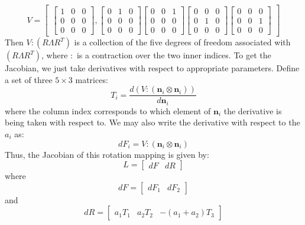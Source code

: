 \documentclass[reqno]{article}
\begin{document}
\begin{equation}
    V
    =
    \begin{bmatrix}
        \begin{bmatrix}
            1 &0 &0 \\
            0 &0 &0 \\
            0 &0 &0
        \end{bmatrix},
        \begin{bmatrix}
            0 &1 &0 \\
            0 &0 &0 \\
            0 &0 &0
        \end{bmatrix}
        \begin{bmatrix}
            0 &0 &1 \\
            0 &0 &0 \\
            0 &0 &0
        \end{bmatrix}
        \begin{bmatrix}
            0 &0 &0 \\
            0 &1 &0 \\
            0 &0 &0
        \end{bmatrix}
        \begin{bmatrix}
            0 &0 &0 \\
            0 &0 &1 \\
            0 &0 &0
        \end{bmatrix}
    \end{bmatrix}
\end{equation}
Then $V : (R \Lambda R^T)$ is a collection of the five degrees of freedom associated with $(R \Lambda R^T)$, where $:$ is a contraction over the two inner indices.
To get the Jacobian, we just take derivatives with respect to appropriate parameters.
Define a set of three $5 \times 3$ matrices:
\begin{equation}
    T_i
    =
    \frac{d \left(V : \left(\mathbf{n}_i \otimes \mathbf{n}_i\right)\right)}{d \mathbf{n}_i}
\end{equation}
where the column index corresponds to which element of $\mathbf{n}_i$ the derivative is being taken with respect to.
We may also write the derivative with respect to the $a_i$ as:
\begin{equation}
    dF_i
    =
    V : \left( \mathbf{n}_i \otimes \mathbf{n}_i \right)
\end{equation}
Thus, the Jacobian of this rotation mapping is given by:
\begin{equation}
    L
    =
    \begin{bmatrix}
        dF &dR
    \end{bmatrix}
\end{equation}
where
\begin{equation}
    dF
    =
    \begin{bmatrix}
        dF_1 &dF_2
    \end{bmatrix}
\end{equation}
and
\begin{equation}
    dR
    =
    \begin{bmatrix}
        a_1 T_1 &a_2 T_2 &-(a_1 + a_2) T_3
    \end{bmatrix}
\end{equation}
\end{document}
